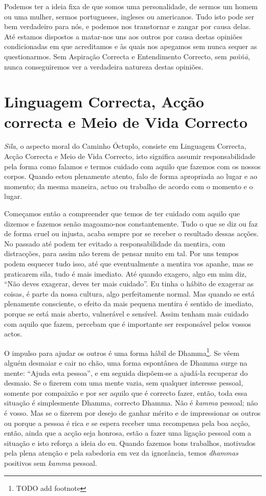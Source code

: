 Podemos ter a ideia fixa de que somos uma personalidade, de sermos um homem ou
uma mulher, sermos portugueses, ingleses ou americanos. Tudo isto pode ser bem
verdadeiro para nós, e podemos nos transtornar e zangar por causa delas. Até
estamos dispostos a matar-nos uns aos outros por causa destas opiniões
condicionadas em que acreditamos e às quais nos apegamos sem nunca sequer as
questionarmos. Sem Aspiração Correcta e Entendimento Correcto, sem \emph{paññā},
nunca conseguiremos ver a verdadeira natureza destas opiniões.

\section{Linguagem Correcta, Acção correcta e Meio de Vida Correcto}

\emph{Sīla}, o aspecto moral do Caminho Óctuplo, consiste em Linguagem Correcta,
Acção Correcta e Meio de Vida Correcto, isto significa assumir responsabilidade
pela forma como falamos e termos cuidado com aquilo que fazemos com os nossos
corpos. Quando estou plenamente atento, falo de forma apropriada ao lugar e ao
momento; da mesma maneira, actuo ou trabalho de acordo com o momento e o lugar.

Começamos então a compreender que temos de ter cuidado com aquilo que dizemos e
fazemos senão magoamo-nos constantemente. Tudo o que se diz ou faz de forma
cruel ou injusta, acaba sempre por se receber o resultado dessas acções. No
passado até podem ter evitado a responsabilidade da mentira, com distracções,
para assim não terem de pensar muito em tal. Por uns tempos podem esquecer tudo
isso, até que eventualmente a mentira vos apanhe, mas se praticarem sīla, tudo é
mais imediato. Até quando exagero, algo em mim diz, “Não deves exagerar, deves
ter mais cuidado”. Eu tinha o hábito de exagerar as coisas, é parte da nossa
cultura, algo perfeitamente normal. Mas quando se está plenamente consciente, o
efeito da mais pequena mentira é sentido de imediato, porque se está mais
aberto, vulnerável e sensível. Assim tenham mais cuidado com aquilo que fazem,
percebam que é importante ser responsável pelos vossos actos.

O impulso para ajudar os outros é uma forma hábil de Dhamma\footnote{TODO add
  footnote}. Se vêem alguém desmaiar e cair no chão, uma forma espontânea de
Dhamma surge na mente: “Ajuda esta pessoa”, e em seguida dispõem-se a ajudá-la
recuperar do desmaio. Se o fizerem com uma mente vazia, sem qualquer interesse
pessoal, somente por compaixão e por ser aquilo que é correcto fazer, então,
toda essa situação é simplesmente Dhamma, correcto Dhamma. Não é \emph{kamma}
pessoal; não é vosso. Mas se o fizerem por desejo de ganhar mérito e de
impressionar os outros ou porque a pessoa é rica e se espera receber uma
recompensa pela boa acção, então, ainda que a acção seja honrosa, estão a fazer
uma ligação pessoal com a situação e isto reforça a ideia do eu. Quando fazemos
bons trabalhos, motivados pela plena atenção e pela sabedoria em vez da
ignorância, temos \emph{dhammas} positivos sem \emph{kamma} pessoal.

